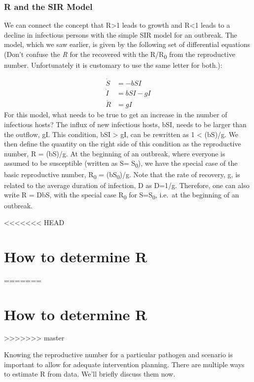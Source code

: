 \documentclass[]{book}
\theoremstyle{definition}
\theoremstyle{definition}
\theoremstyle{definition}
\theoremstyle{remark}
\begin{document}
\hypertarget{myadvancedbox}{%
\subsubsection{R and the SIR Model}\label{myadvancedbox}}

We can connect the concept that R\textgreater{}1 leads to growth and
R\textless{}1 leads to a decline in infectious persons with the simple
SIR model for an outbreak. The model, which we saw earlier, is given by
the following set of differential equations (Don't confuse the \emph{R}
for the recovered with the R/R\textsubscript{0} from the reproductive
number. Unfortunately it is customary to use the same letter for both.):

\[ 
\begin{aligned}
\dot S &= - b SI \\
\dot I &= b S I - g I \\
\dot R &= g I
\end{aligned}
\] For this model, what needs to be true to get an increase in the
number of infectious hosts? The influx of new infectious hosts, bSI,
needs to be larger than the outflow, gI. This condition, bSI
\textgreater{} gI, can be rewritten as 1 \textless{} (bS)/g. We then
define the quantity on the right side of this condition as the
reproductive number, R = (bS)/g. At the beginning of an outbreak, where
everyone is assumed to be susceptible (written as S=
S\textsubscript{0}), we have the special case of the basic reproductive
number, R\textsubscript{0} = (bS\textsubscript{0})/g. Note that the rate
of recovery, g, is related to the average duration of infection, D as
D=1/g. Therefore, one can also write R = DbS, with the special case
R\textsubscript{0} for S=S\textsubscript{0}, i.e.~at the beginning of an
outbreak.

<<<<<<< HEAD
\hypertarget{how-to-determine-r}{%
\section{How to determine R}\label{how-to-determine-r}}
=======
\section{How to determine R}\label{how-to-determine-r}
>>>>>>> master

Knowing the reproductive number for a particular pathogen and scenario
is important to allow for adequate intervention planning. There are
multiple ways to estimate R from data. We'll briefly discuss them now.
\end{document}
